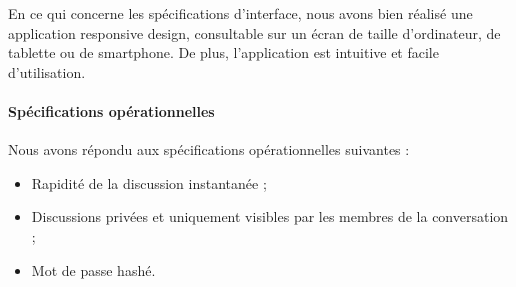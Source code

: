 En ce qui concerne les spécifications d'interface, nous avons bien réalisé une application responsive design, consultable sur un écran de taille d'ordinateur, de tablette ou de smartphone. De plus, l'application est intuitive et facile d'utilisation.

\paragraph{Spécifications opérationnelles \\}

Nous avons répondu aux spécifications opérationnelles suivantes :
\begin{itemize}
	\item Rapidité de la discussion instantanée ; 
	\item Discussions privées et uniquement visibles par les membres de la conversation ;
	\item Mot de passe hashé. \\
\end{itemize}